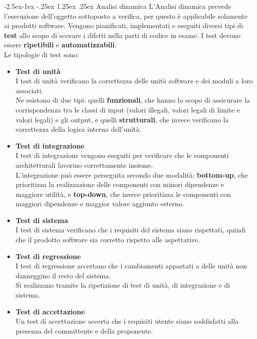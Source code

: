 \documentclass[a4paper,12pt]{article}
\makeatletter
\renewcommand\paragraph{\@startsection{paragraph}{4}{\z@}%
            {-2.5ex\@plus -1ex \@minus -.25ex}%
            {1.25ex \@plus .25ex}%
            {\normalfont\normalsize\bfseries}}
\makeatother
\begin{document}
            \paragraph{Analisi dinamica}
                L'Analisi dinamica prevede l'esecuzione dell'oggetto sottoposto a verifica, per questo è applicabile solamente ai prodotti software.
                Vengono pianificati, implementati e eseguiti diversi tipi di \textbf{test} allo scopo di scovare i difetti nella parti di codice in esame.
                I test devono essere \textbf{ripetibili} e \textbf{automatizzabili}.\\
                Le tipologie di test sono:
                \begin{itemize}
                    \item \textbf{Test di unità}\\
                        I test di unità verificano la correttezza delle unità software e dei moduli a loro associati.\\
                        Ne esistono di due tipi: quelli \textbf{funzionali}, che hanno lo scopo di assicurare la corrispondenza tra le classi di input (valori illegali, valori legali di limite e valori legali) e gli output, e quelli \textbf{strutturali}, che invece verificano la correttezza della logica interna dell'unità.
                    \item \textbf{Test di integrazione}\\
                        I test di integrazione vengono eseguiti per verificare che le componenti architetturali lavorino correttamente insieme.\\
                        L'integrazione può essere perseguita secondo due modalità: \textbf{bottom-up}, che prioritizza la realizzazione delle componenti con minori dipendenze e maggiore utilità, e \textbf{top-down}, che invece prioritizza le componenti con maggiori dipendenze e maggior valore aggiunto esterno.
                    \item \textbf{Test di sistema}\\
                        I test di sistema verificano che i requisiti del sistema siano rispettati, quindi che il prodotto software sia corretto rispetto alle aspettative.
                    \item \textbf{Test di regressione}\\
                        I test di regressione accertano che i cambiamenti appartati a delle unità non danneggino il resto del sistema.\\
                        Si realizzano tramite la ripetizione di test di unità, di integrazione e di sistema.
                    \item \textbf{Test di accettazione}\\
                        Un test di accettazione accerta che i requisiti utente siano soddisfatti alla presenza del committente e della proponente.
                \end{itemize}
\end{document}
